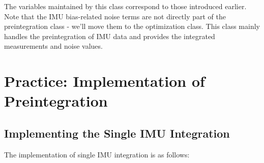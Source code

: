 The variables maintained by this class correspond to those introduced earlier. Note that the IMU bias-related noise terms are not directly part of the preintegration class - we'll move them to the optimization class. This class mainly handles the preintegration of IMU data and provides the integrated measurements and noise values.

\section{Practice: Implementation of Preintegration}
\subsection{Implementing the Single IMU Integration}

The implementation of single IMU integration is as follows:
